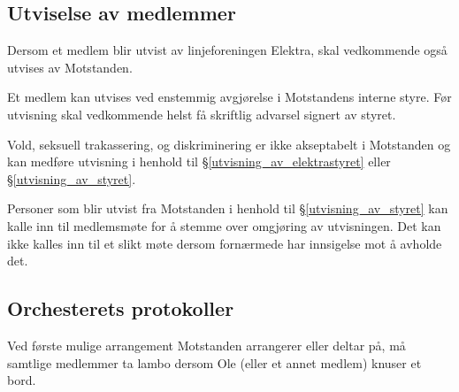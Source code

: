 \subsection{Utviselse av medlemmer}
    \begin{statute}[\label{utvisning_av_elektrastyret}]
        Dersom et medlem blir utvist av linjeforeningen Elektra, skal vedkommende også utvises av Motstanden.
    \end{statute}
    \begin{statute}[\label{utvisning_av_styret}]
        Et medlem kan utvises ved enstemmig avgjørelse i Motstandens interne styre. Før utvisning skal vedkommende helst få skriftlig advarsel signert av styret.
    \end{statute}
    \begin{statute}
        Vold, seksuell trakassering, og diskriminering er ikke akseptabelt i Motstanden og kan medføre utvisning i henhold til \S\hspace{3pt}\ref{utvisning_av_elektrastyret} eller  \S\hspace{3pt}\ref{utvisning_av_styret}.
    \end{statute}
    \begin{statute}
        Personer som blir utvist fra Motstanden i henhold til \S\hspace{3pt}\ref{utvisning_av_styret} kan kalle inn til medlemsmøte for å stemme over omgjøring av utvisningen. Det kan ikke kalles inn til et slikt møte dersom fornærmede har innsigelse mot å avholde det.
    \end{statute}

\subsection{Orchesterets protokoller}
    \begin{statute}
        Ved første mulige arrangement Motstanden arrangerer eller deltar på, må samtlige medlemmer ta lambo dersom Ole (eller et annet medlem) knuser et bord.     
    \end{statute}

